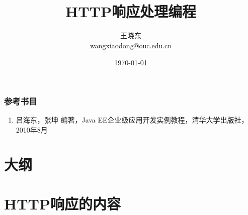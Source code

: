 
\title[KevinW@OUC]{\\  
HTTP响应处理编程}
\author[王晓东]{王晓东\\
  \href{mailto:wangxiaodong@ouc.edu.cn}{\footnotesize wangxiaodong@ouc.edu.cn}}
\date{\today}


 \frame{\titlepage}

\begin{frame}
\frametitle{参考书目}
\begin{enumerate}
\item 吕海东，张坤 编著，Java EE企业级应用开发实例教程，清华大学出版社，2010年8月
\end{enumerate}  
\end{frame}


\section*{大纲}

\section{HTTP响应的内容}

